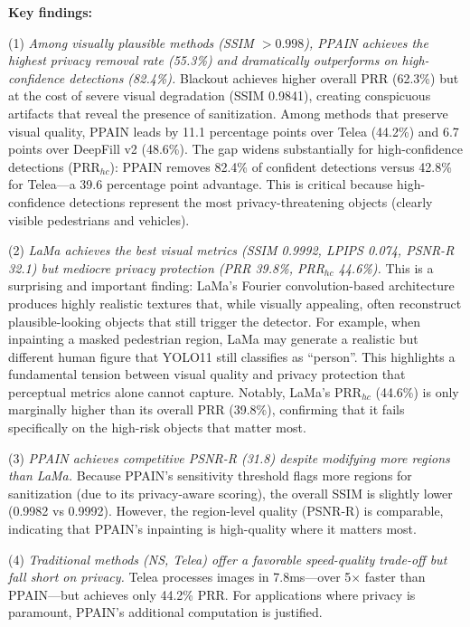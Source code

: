 \documentclass[preprint,12pt]{elsarticle}
\begin{document}
\textbf{Key findings:}

(1) \emph{Among visually plausible methods (SSIM $> 0.998$), PPAIN achieves the highest privacy removal rate (55.3\%) and dramatically outperforms on high-confidence detections (82.4\%).} Blackout achieves higher overall PRR (62.3\%) but at the cost of severe visual degradation (SSIM 0.9841), creating conspicuous artifacts that reveal the presence of sanitization. Among methods that preserve visual quality, PPAIN leads by 11.1 percentage points over Telea (44.2\%) and 6.7 points over DeepFill v2 (48.6\%). The gap widens substantially for high-confidence detections (PRR$_{hc}$): PPAIN removes 82.4\% of confident detections versus 42.8\% for Telea---a 39.6 percentage point advantage. This is critical because high-confidence detections represent the most privacy-threatening objects (clearly visible pedestrians and vehicles).

(2) \emph{LaMa achieves the best visual metrics (SSIM 0.9992, LPIPS 0.074, PSNR-R 32.1) but mediocre privacy protection (PRR 39.8\%, PRR$_{hc}$ 44.6\%).} This is a surprising and important finding: LaMa's Fourier convolution-based architecture produces highly realistic textures that, while visually appealing, often reconstruct plausible-looking objects that still trigger the detector. For example, when inpainting a masked pedestrian region, LaMa may generate a realistic but different human figure that YOLO11 still classifies as ``person''. This highlights a fundamental tension between visual quality and privacy protection that perceptual metrics alone cannot capture. Notably, LaMa's PRR$_{hc}$ (44.6\%) is only marginally higher than its overall PRR (39.8\%), confirming that it fails specifically on the high-risk objects that matter most.

(3) \emph{PPAIN achieves competitive PSNR-R (31.8) despite modifying more regions than LaMa.} Because PPAIN's sensitivity threshold flags more regions for sanitization (due to its privacy-aware scoring), the overall SSIM is slightly lower (0.9982 vs 0.9992). However, the region-level quality (PSNR-R) is comparable, indicating that PPAIN's inpainting is high-quality where it matters most.

(4) \emph{Traditional methods (NS, Telea) offer a favorable speed-quality trade-off but fall short on privacy.} Telea processes images in 7.8ms---over 5$\times$ faster than PPAIN---but achieves only 44.2\% PRR. For applications where privacy is paramount, PPAIN's additional computation is justified.
\end{document}
